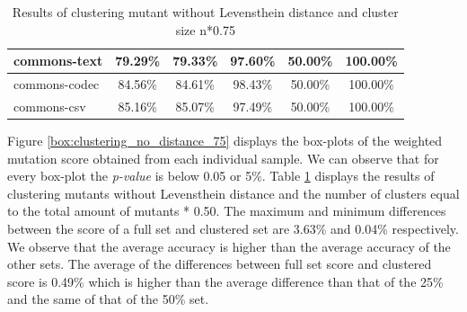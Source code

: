 \documentclass[conference,draftclsnofoot,onecolumn]{IEEEtran}
\begin{document}
\begin{table}[ht]
\begin{tabular}{|l|c|c|c|c|c|}
commons-text                  & 79.29\%                                                                                 & 79.33\%                                                                                     & 97.60\%                                                                              & 50.00\%                                                                               & 100.00\%                                                                             \\ \hline
commons-codec                 & 84.56\%                                                                                 & 84.61\%                                                                                     & 98.43\%                                                                              & 50.00\%                                                                               & 100.00\%                                                                             \\ \hline
commons-csv                   & 85.16\%                                                                                 & 85.07\%                                                                                     & 97.49\%                                                                              & 50.00\%                                                                               & 100.00\%                                                                             \\ \hline
\end{tabular}
\caption{\label{tab:clustering_no_distance_75}Results of clustering mutant without Levensthein distance and cluster size n*0.75}
\end{table}

Figure \ref{box:clustering_no_distance_75} displays the box-plots of the weighted mutation score obtained from each individual sample. 
We can observe that for every box-plot the \textit{p-value} is below 0.05 or 5\%.
Table \ref{tab:clustering_no_distance_75} displays the results of clustering mutants without Levensthein distance and the number of clusters equal to the total amount of mutants * 0.50.
The maximum and minimum differences between the score of a full set and clustered set are 3.63\% and 0.04\% respectively.
We observe that the average accuracy is higher than the average accuracy of the other sets.
The average of the differences between full set score and clustered score is  0.49\% which is higher than the average difference than that of the 25\% and the same of that of the 50\% set.
\end{document}
